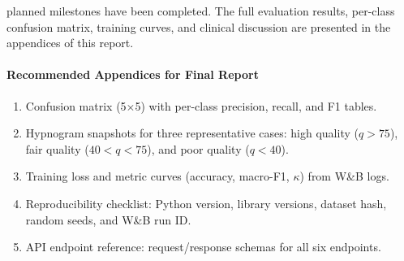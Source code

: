 \documentclass[10pt]{article}
\begin{document}
\tAll planned milestones have been completed. The full evaluation results, per-class confusion matrix, training curves, and clinical discussion are presented in the appendices of this report.

\paragraph{Recommended Appendices for Final Report}
\begin{enumerate}
\item Confusion matrix (5$\times$5) with per-class precision, recall, and F1 tables.
\item Hypnogram snapshots for three representative cases: high quality ($q > 75$), fair quality ($40 < q < 75$), and poor quality ($q < 40$).
\item Training loss and metric curves (accuracy, macro-F1, $\kappa$) from W\&B logs.
\item Reproducibility checklist: Python version, library versions, dataset hash, random seeds, and W\&B run ID.
\item API endpoint reference: request/response schemas for all six endpoints.
\end{enumerate}
\end{document}
